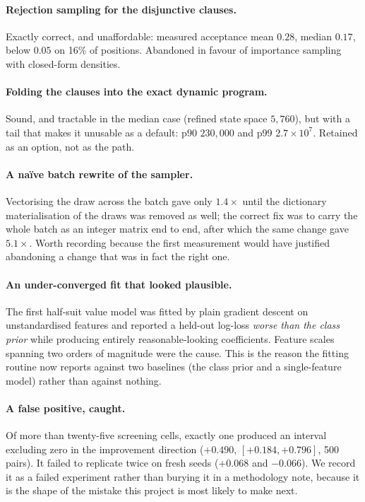 \documentclass[11pt,a4paper]{article}
\begin{document}
\paragraph{Rejection sampling for the disjunctive clauses.} Exactly correct, and
unaffordable: measured acceptance mean $0.28$, median $0.17$, below $0.05$ on
16\% of positions. Abandoned in favour of importance sampling with closed-form
densities.

\paragraph{Folding the clauses into the exact dynamic program.} Sound, and
tractable in the median case (refined state space $5{,}760$), but with a tail
that makes it unusable as a default: p90 $230{,}000$ and p99
$2.7 \times 10^{7}$. Retained as an option, not as the path.

\paragraph{A na\"ive batch rewrite of the sampler.} Vectorising the draw across
the batch gave only $1.4\times$ until the dictionary materialisation of the
draws was removed as well; the correct fix was to carry the whole batch as an
integer matrix end to end, after which the same change gave $5.1\times$. Worth
recording because the first measurement would have justified abandoning a
change that was in fact the right one.

\paragraph{An under-converged fit that looked plausible.} The first half-suit
value model was fitted by plain gradient descent on unstandardised features and
reported a held-out log-loss \emph{worse than the class prior} while producing
entirely reasonable-looking coefficients. Feature scales spanning two orders of
magnitude were the cause. This is the reason the fitting routine now reports
against two baselines (the class prior and a single-feature model) rather than
against nothing.

\paragraph{A false positive, caught.} Of more than twenty-five screening cells,
exactly one produced an interval excluding zero in the improvement direction
($+0.490$, $[+0.184, +0.796]$, 500 pairs). It failed to replicate twice on fresh
seeds ($+0.068$ and $-0.066$). We record it as a failed experiment rather than
burying it in a methodology note, because it is the shape of the mistake this
project is most likely to make next.
\end{document}
